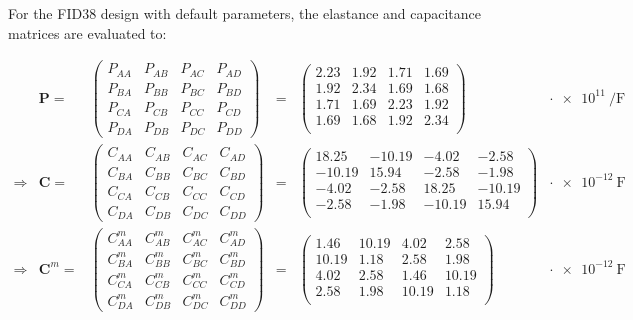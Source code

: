 For the FID38 design with default parameters, the elastance and capacitance matrices are evaluated to:

\begin{equation} 
\label{eq:fid38-matrix-evaluation}
\begin{array}{rrccclc}
 & \bm{P} = &
 \begin{pmatrix}
P_{AA} & P_{AB} & P_{AC} & P_{AD} \\ 
P_{BA} & P_{BB} & P_{BC} & P_{BD} \\ 
P_{CA} & P_{CB} & P_{CC} & P_{CD} \\ 
P_{DA} & P_{DB} & P_{DC} & P_{DD}
\end{pmatrix}
&=&
\begin{pmatrix}
2.23 & 1.92 & 1.71 & 1.69 \\
1.92 & 2.34 & 1.69 & 1.68 \\
1.71 & 1.69 & 2.23 & 1.92 \\
1.69 & 1.68 & 1.92 & 2.34 \\
\end{pmatrix}
& \cdot \SI{e11}{\per\farad} \\
\Rightarrow & \bm{C} = &
\begin{pmatrix}
C_{AA} & C_{AB} & C_{AC} & C_{AD} \\ 
C_{BA} & C_{BB} & C_{BC} & C_{BD} \\ 
C_{CA} & C_{CB} & C_{CC} & C_{CD} \\ 
C_{DA} & C_{DB} & C_{DC} & C_{DD}
\end{pmatrix}
&=&
\begin{pmatrix}
18.25 & -10.19 & -4.02 & -2.58 \\
-10.19 & 15.94 & -2.58 & -1.98 \\
-4.02 & -2.58 & 18.25 & -10.19 \\
-2.58 & -1.98 & -10.19 & 15.94 \\
\end{pmatrix}
& \cdot \SI{e-12}{\farad} \\
\Rightarrow & \bm{C}^m = &
\begin{pmatrix}
C_{AA}^m & C_{AB}^m & C_{AC}^m & C_{AD}^m \\ 
C_{BA}^m & C_{BB}^m & C_{BC}^m & C_{BD}^m \\ 
C_{CA}^m & C_{CB}^m & C_{CC}^m & C_{CD}^m \\ 
C_{DA}^m & C_{DB}^m & C_{DC}^m & C_{DD}^m
\end{pmatrix}
&=&
\begin{pmatrix}
1.46 & 10.19 & 4.02 & 2.58 \\
10.19 & 1.18 & 2.58 & 1.98 \\
4.02 & 2.58 & 1.46 & 10.19 \\
2.58 & 1.98 & 10.19 & 1.18 \\
\end{pmatrix}
& \cdot \SI{e-12}{\farad} 
\end{array}
\end{equation}

